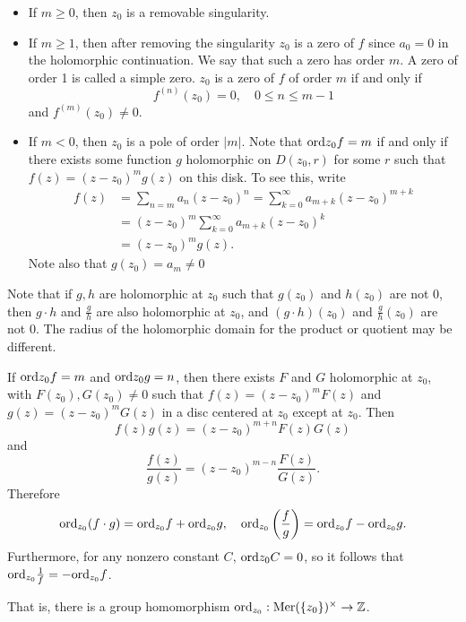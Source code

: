 \begin{defn}
\begin{itemize}
  \item{
    If $m \geq 0$, then $z_0$ is a removable singularity.
  }
  \item{
    If $m \geq 1$, then after removing the singularity
    $z_0$ is a zero of $f$ since $a_0 = 0$ in the holomorphic
    continuation. We say that such a zero has order $m$. A
    zero of order 1 is called a simple zero.
    $z_0$ is a zero of $f$ of order $m$ if and only if
    $$
    f^{(n)}(z_0) = 0, \quad 0 \leq n \leq m - 1
    $$
    and $f^{(m)}(z_0) \neq 0$.
  }
  \item{
    If $m < 0$, then $z_0$ is a pole of order $|m|$.
    Note that $\mathrm{ord} z_0 f = m$ if and only if there exists
    some function $g$ holomorphic on $D(z_0, r)$ for some $r$
    such that $f(z) = (z - z_0)^m g(z)$ on this disk.
    To see this, write
    \begin{align*}
       f(z)
    &= \sum_{n=m} a_n (z - z_0)^n
     = \sum_{k=0}^\infty a_{m+k} (z - z_0)^{m+k} \\
    &= (z - z_0)^m \sum_{k=0}^\infty a_{m+k} (z - z_0)^k \\
    &= (z - z_0)^m g(z).
    \end{align*}
    Note also that $g(z_0) = a_m \neq 0$
  }
\end{itemize}
\end{defn}

Note that if $g, h$ are holomorphic at $z_0$ such that
$g(z_0)$ and $h(z_0)$ are not 0, then $g \cdot h$ and
$\frac{g}{h}$ are also holomorphic at $z_0$, and
$(g \cdot h)(z_0)$ and $\frac{g}{h}(z_0)$ are not 0.
The radius of the holomorphic domain for the product or quotient
may be different.

If $\mathrm{ord} z_0 f = m$ and $\mathrm{ord} z_0 g = n$, then there exists
$F$ and $G$ holomorphic at $z_0$, with $F(z_0), G(z_0) \neq 0$
such that
$f(z) = (z - z_0)^m F(z)$ and $g(z) = (z - z_0)^m G(z)$
in a disc centered at $z_0$ except at $z_0$. Then
$$
f(z) g(z) = (z - z_0)^{m + n} F(z) G(z)
$$
and
$$
\frac{f(z)}{g(z)} = (z - z_0)^{m - n} \frac{F(z)}{G(z)}.
$$
Therefore
$$
  \mathrm{ord}_{z_0} (f \cdot g)
= \mathrm{ord}_{z_0} f + \mathrm{ord}_{z_0} g, \quad
  \mathrm{ord}_{z_0} \left(\frac{f}{g}\right)
= \mathrm{ord}_{z_0} f - \mathrm{ord}_{z_0} g.
$$
Furthermore, for any nonzero constant $C$,
$\mathrm{ord} z_0 C = 0$, so it follows that
$\mathrm{ord}_{z_0} \frac{1}{f} = -\mathrm{ord}_{z_0} f$.

That is, there is a group homomorphism
$\mathrm{\mathrm{ord}}_{z_0} : \mathrm{Mer}(\{z_0\})^\times \to \mathbb{Z}$.


